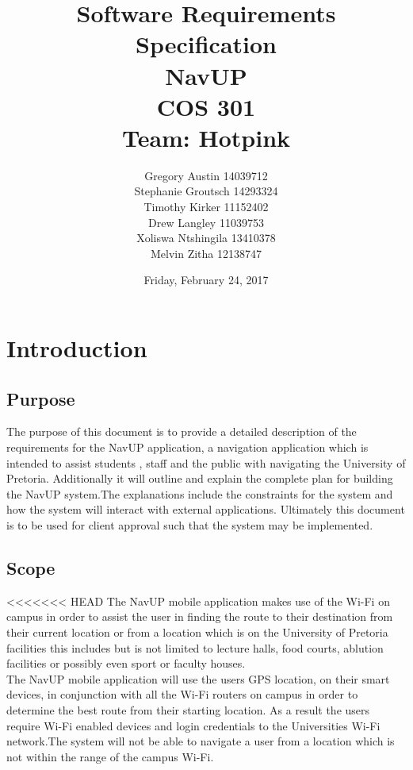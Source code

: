 \documentclass[11pt,a4paper]{article}
\title{Software Requirements Specification \\ NavUP \\ COS 301 \\ Team: Hotpink}
\date{Friday, February 24, 2017}
\author{Gregory Austin 14039712 \\ Stephanie Groutsch 14293324 \\ Timothy Kirker 11152402 \\ Drew Langley 11039753 \\ Xoliswa Ntshingila 13410378
\\ Melvin Zitha 12138747}
\begin{document}
\maketitle
\newpage
\tableofcontents

\newpage
\section{Introduction}
	\subsection{Purpose}
	The purpose of this document is to provide a detailed description of the requirements for the NavUP application, a navigation application which is intended to assist students , staff and the  public with navigating the University of Pretoria. Additionally it will outline and explain the complete plan for building the NavUP system.The explanations include the constraints for the system and how the system will interact with external applications. Ultimately this document is to be used for client approval such that the system may be implemented.

	\subsection{Scope}
<<<<<<< HEAD
The NavUP mobile application makes use of the Wi-Fi on campus in order to assist the user in finding the route to their destination from their current location or from a location which is on the University of Pretoria facilities this includes but is not limited to lecture halls, food courts, ablution facilities or possibly even sport or faculty houses. 
\\

The NavUP mobile application will use the users GPS location, on their smart devices, in conjunction with all the Wi-Fi routers on campus in order to determine the best route from their starting location. As a result the users require Wi-Fi enabled devices and login credentials to the Universities Wi-Fi network.The system will not be able to navigate a user from a location which is not within the range of the campus Wi-Fi.
\\
\end{document}
